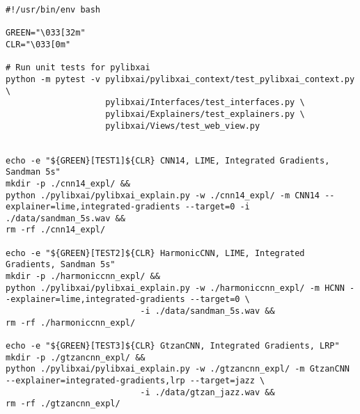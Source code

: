 \documentclass[
    bindingoffset=5mm,  %
    footnoteindent=3mm, %
    hyphenation=true    %
]{src/wut-thesis}
\begin{document}
\begin{verbatim}
#!/usr/bin/env bash

GREEN="\033[32m"
CLR="\033[0m"

# Run unit tests for pylibxai
python -m pytest -v pylibxai/pylibxai_context/test_pylibxai_context.py \
                    pylibxai/Interfaces/test_interfaces.py \
                    pylibxai/Explainers/test_explainers.py \
                    pylibxai/Views/test_web_view.py


echo -e "${GREEN}[TEST1]${CLR} CNN14, LIME, Integrated Gradients, Sandman 5s"
mkdir -p ./cnn14_expl/ &&
python ./pylibxai/pylibxai_explain.py -w ./cnn14_expl/ -m CNN14 --explainer=lime,integrated-gradients --target=0 -i ./data/sandman_5s.wav &&
rm -rf ./cnn14_expl/

echo -e "${GREEN}[TEST2]${CLR} HarmonicCNN, LIME, Integrated Gradients, Sandman 5s"
mkdir -p ./harmoniccnn_expl/ &&
python ./pylibxai/pylibxai_explain.py -w ./harmoniccnn_expl/ -m HCNN --explainer=lime,integrated-gradients --target=0 \
                           -i ./data/sandman_5s.wav &&
rm -rf ./harmoniccnn_expl/

echo -e "${GREEN}[TEST3]${CLR} GtzanCNN, Integrated Gradients, LRP"
mkdir -p ./gtzancnn_expl/ &&
python ./pylibxai/pylibxai_explain.py -w ./gtzancnn_expl/ -m GtzanCNN --explainer=integrated-gradients,lrp --target=jazz \
                           -i ./data/gtzan_jazz.wav &&
rm -rf ./gtzancnn_expl/
\end{verbatim}
\end{document}
